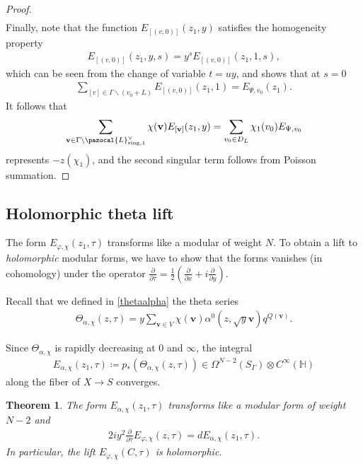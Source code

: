 \documentclass[a4paper,11pt]{amsart} %
\newcommand{\8}{\infty}
\newcommand{\vbf}{\mathbf{v}}
\newcommand{\HH}{\mathbb{H}}
\newcommand{\sing}{\mathrm{sing}}
\newcommand{\Lcal}{\pazocal{L}}
\theoremstyle{mytheoremstyle}
\newtheorem{thm}{Theorem}[section]
\theoremstyle{remark}
\numberwithin{equation}{section}
\begin{document}
\begin{proof}
\begin{align}
\end{align}
Finally, note that the function $E_{[(v,0)]}(z_1,y)$ satisfies the homogeneity property 
\begin{align}
E_{[(v,0)]}(z_1,y,s)=y^sE_{[(v,0)]}(z_1,1,s),
\end{align}which can be seen from the change of variable $t=uy$, and shows that at $s=0$
\begin{align}
\sum_{[v] \in \Gamma \backslash (v_0+L) } E_{[(v,0)]}(z_1,1)=E_{\Psi,v_0}(z_1).
\end{align}
It follows that
\begin{align}
\sum_{\vbf \in \Gamma \backslash \Lcal^\vee_{\sing,1} } \chi(\vbf) E_{[\vbf]}(z_1,y) =\sum_{v_0 \in D_L} \chi_1(v_0) E_{\Psi,v_0}
\end{align}
represents $-z(\chi_1)$, and the second singular term follows from Poisson summation.
\end{proof}


\subsection{Holomorphic theta lift} \label{sec:thetalift}
 The form $E_{\varphi, \chi}(z_1,\tau)$ transforms like a modular of weight $N$. To obtain a lift to {\em holomorphic} modular forms, we have to show that the forms vanishes (in cohomology) under the operator $\frac{\partial}{\partial \overline{\tau}}=\frac{1}{2} \left (\frac{\partial}{\partial x}+i\frac{\partial}{\partial y} \right )$.

Recall that we defined in \eqref{thetaalpha} the theta series
\begin{align}
\Theta_{\alpha, \chi}(z,\tau) = y\sum_{\vbf \in V} \chi(\vbf)\alpha^0(z,\sqrt{y}\vbf)q^{Q(\vbf)}.
\end{align}

Since $\Theta_{\alpha, \chi}$ is rapidly decreasing at $0$ and $\8$, the integral
 \begin{align}
 E_{\alpha, \chi}(z_1,\tau) \coloneqq p_\ast \left ( \Theta_{\alpha, \chi}(z,\tau) \right )\in \Omega^{N-2}(S_\Gamma) \otimes C^\8(\HH)
 \end{align}
along the fiber of $X \longrightarrow S$ converges.


\begin{thm} \label{holo in coho}
The form $ E_{\alpha, \chi}(z_1,\tau)$ transforms like a modular form of weight $N-2$ and 
\begin{align}
2iy^2\frac{\partial}{\partial \overline{\tau}}E_{\varphi, \chi}(z,\tau)=dE_{\alpha, \chi}(z_1,\tau).
\end{align} In particular, the lift $E_{\varphi, \chi}(C,\tau)$ is holomorphic.
\end{thm}
\end{document}
